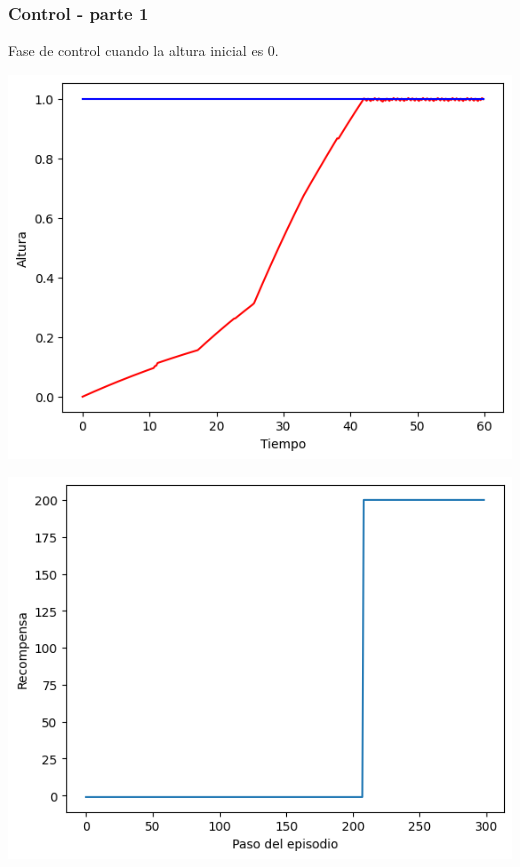 \documentclass{beamer}
\begin{document}
\begin{frame}
\frametitle{Control - parte 1}

Fase de control cuando la altura inicial es 0.

\begin{center}
\includegraphics[scale=0.31]{altura_tiempo_p1.png}

\includegraphics[scale=0.31]{recompensa_pasos_p1.png}
\end{center}

\end{frame}
\end{document}
